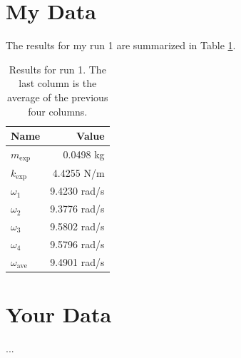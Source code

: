 \section{My Data}
The results for my run 1 are summarized in Table \ref{table.11.results}.
\begin{table}
    \begin{center}
        \begin{tabular}{|l|r|}
            \hline
            Name & Value \\
            \hline
            $m_{\text{exp}}$ & 0.0498 kg \\
            $k_{\text{exp}}$ & 4.4255 N/m \\
            $\omega_{1}$ & 9.4230 rad/s \\
            $\omega_{2}$ & 9.3776 rad/s \\
            $\omega_{3}$ & 9.5802 rad/s \\
            $\omega_{4}$ & 9.5796 rad/s \\
            $\omega_{\text{ave}}$ & 9.4901 rad/s \\
            \hline
        \end{tabular}
    \end{center}
    \caption{Results for run 1. The last column is the average of the previous four columns.}
	\label{table.11.results}
\end{table}
\section{Your Data}
...
